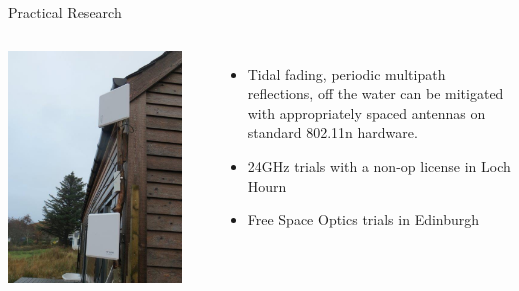 \documentclass{beamer}
\begin{document}
\begin{frame}{Practical Research}
  \begin{columns}
    \vspace{-1\baselineskip}
    \includegraphics[width=1.1\textwidth]{tommy-diversity.jpg}
      \vspace{-2\baselineskip}
      \begin{center}
      \end{center}
    \begin{itemize}
      \item Tidal fading, periodic multipath reflections, off the
        water can be mitigated with appropriately spaced antennas on
        standard 802.11n hardware.
      \item 24GHz trials with a non-op license in Loch Hourn
      \item Free Space Optics trials in Edinburgh
    \end{itemize}
  \end{columns}
\end{frame}
\end{document}
